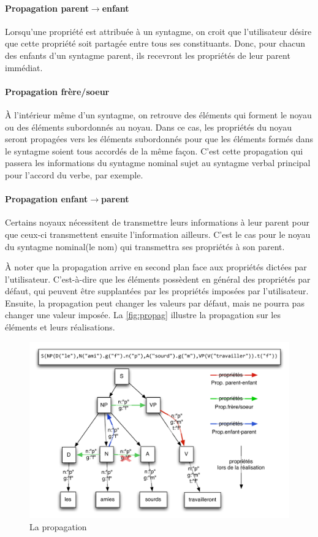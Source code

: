 \documentclass[11pt]{article} %
\begin{document}
\paragraph{Propagation parent$\rightarrow$enfant}

Lorsqu'une propriété est attribuée à un syntagme, on croit que l'utilisateur
désire que cette propriété soit partagée entre tous ses constituants.
Donc, pour chacun des enfants d'un syntagme parent, ils recevront
les propriétés de leur parent immédiat.

\paragraph{Propagation frère/soeur}

À l'intérieur même d'un syntagme, on retrouve des éléments qui forment
le noyau ou des éléments subordonnés au noyau. Dans ce cas, les propriétés
du noyau seront propagées vers les éléments subordonnés pour que les
éléments formés dans le syntagme soient tous accordés de la même façon.
C'est cette propagation qui passera les informations du syntagme nominal
sujet au syntagme verbal principal pour l'accord du verbe, par exemple. 

\paragraph{Propagation enfant$\rightarrow$parent}

Certains noyaux nécessitent de transmettre leurs informations à leur
parent pour que ceux-ci transmettent ensuite l'information ailleurs.
C'est le cas pour le noyau du syntagme nominal(le nom) qui transmettra
ses propriétés à son parent.

À noter que la propagation arrive en second plan face aux propriétés
dictées par l'utilisateur. C'est-à-dire que les éléments possèdent
en général des propriétés par défaut, qui peuvent être supplantées
par les propriétés imposées par l'utilisateur. Ensuite, la propagation
peut changer les valeurs par défaut, mais ne pourra pas changer une
valeur imposée. La \autoref{fig:propag} illustre la propagation
sur les éléments et leurs réalisations.
\begin{figure}
\centering
\caption{La propagation}
\label{fig:propag}
\includegraphics[scale=0.8]{Propagation}
\end{figure}
\end{document}
